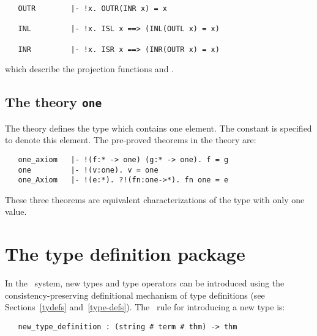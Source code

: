 {{\begin{hol}
\begin{verbatim}
   OUTR        |- !x. OUTR(INR x) = x

   INL         |- !x. ISL x ==> (INL(OUTL x) = x)

   INR         |- !x. ISR x ==> (INR(OUTR x) = x)
\end{verbatim}\end{hol}

\noindent which describe the projection functions  and .

\subsection{The theory {\tt one}}%
%
%

The theory  defines  the type   which  contains one element.
The constant    is specified  to denote  this element.   The pre-proved
theorems in the theory  are:

\begin{hol}
\begin{verbatim}
   one_axiom   |- !(f:* -> one) (g:* -> one). f = g
   one         |- !(v:one). v = one
   one_Axiom   |- !(e:*). ?!(fn:one->*). fn one = e
\end{verbatim}\end{hol}

\noindent These three theorems are equivalent characterizations of the type 
with only one value.

\section{The type definition package}\label{types-package}

In the \HOL\  system, new types and type operators can be introduced
using the  consistency-preserving definitional  mechanism  of  
type  definitions (see Sections~\ref{tydefs} and~\ref{type-defs}).  The \ML\
rule for introducing a new type is:

\begin{hol}
\begin{verbatim}
   new_type_definition : (string # term # thm) -> thm
\end{verbatim}\end{hol}

}}
